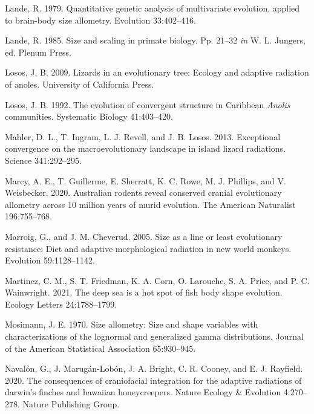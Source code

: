\documentclass[
  11pt,
]{article}
\newlength{\cslhangindent}
\newlength{\cslentryspacingunit} %
\newenvironment{CSLReferences}[2] %
 {%
  \setlength{\parindent}{0pt}
  \ifodd #1
  \let\oldpar\par
  \def\par{\hangindent=\cslhangindent\oldpar}
  \fi
  \setlength{\parskip}{#2\cslentryspacingunit}
 }%
 {}
\begin{document}
\begin{CSLReferences}{1}{0}
\leavevmode{}%
Lande, R. 1979. Quantitative genetic analysis of multivariate evolution,
applied to brain-body size allometry. Evolution 33:402--416.

\leavevmode{}%
Lande, R. 1985. Size and scaling in primate biology. Pp. 21--32
\emph{in} W. L. Jungers, ed. Plenum Press.

\leavevmode{}%
Losos, J. B. 2009. Lizards in an evolutionary tree: Ecology and adaptive
radiation of anoles. University of California Press.

\leavevmode{}%
Losos, J. B. 1992. The evolution of convergent structure in {C}aribbean
\emph{{A}nolis} communities. Systematic Biology 41:403--420.

\leavevmode{}%
Mahler, D. L., T. Ingram, L. J. Revell, and J. B. Losos. 2013.
Exceptional convergence on the macroevolutionary landscape in island
lizard radiations. Science 341:292--295.

\leavevmode{}%
Marcy, A. E., T. Guillerme, E. Sherratt, K. C. Rowe, M. J. Phillips, and
V. Weisbecker. 2020. Australian rodents reveal conserved cranial
evolutionary allometry across 10 million years of murid evolution. The
American Naturalist 196:755--768.

\leavevmode{}%
Marroig, G., and J. M. Cheverud. 2005. Size as a line or least
evolutionary resistance: Diet and adaptive morphological radiation in
new world monkeys. Evolution 59:1128--1142.

\leavevmode{}%
Martinez, C. M., S. T. Friedman, K. A. Corn, O. Larouche, S. A. Price,
and P. C. Wainwright. 2021. The deep sea is a hot spot of fish body
shape evolution. Ecology Letters 24:1788--1799.

\leavevmode{}%
Mosimann, J. E. 1970. Size allometry: Size and shape variables with
characterizations of the lognormal and generalized gamma distributions.
Journal of the American Statistical Association 65:930--945.

\leavevmode{}%
Navalón, G., J. Marugán-Lobón, J. A. Bright, C. R. Cooney, and E. J.
Rayfield. 2020. The consequences of craniofacial integration for the
adaptive radiations of darwin's finches and hawaiian honeycreepers.
Nature Ecology \& Evolution 4:270--278. Nature Publishing Group.


\end{CSLReferences}
\end{document}
